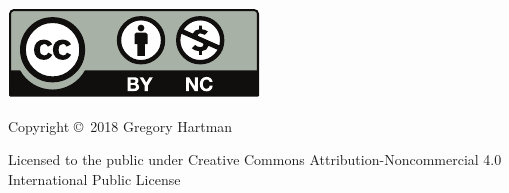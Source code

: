 \noindent\hskip -1in\begin{minipage}{2in}
\includegraphics{text/by-nc} 
\end{minipage}
\begin{minipage}{3in}
\noindent Copyright \copyright\ 2018 Gregory Hartman

Licensed to the public under Creative Commons Attribution-Noncommercial 4.0 International Public License
\end{minipage}

